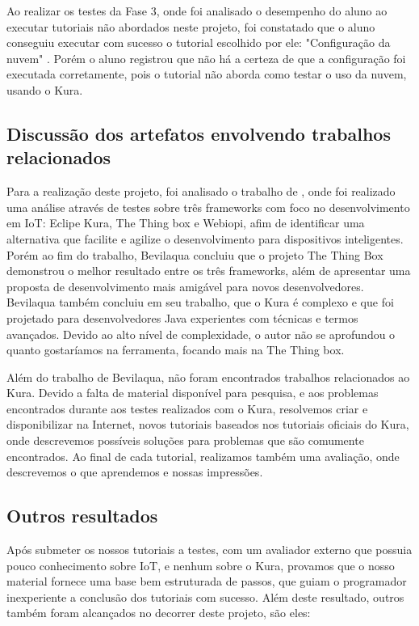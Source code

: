 Ao realizar os testes da Fase 3, onde foi analisado o desempenho do aluno ao executar tutoriais não abordados neste projeto, foi constatado que o aluno conseguiu executar com sucesso o tutorial escolhido por ele: "Configuração da nuvem" \cite{CloudConfiguration}. Porém o aluno registrou que não há a certeza de que a configuração foi executada corretamente, pois o tutorial não aborda como testar o uso da nuvem, usando o Kura.

\subsection{Discussão dos artefatos envolvendo trabalhos relacionados}

Para a realização deste projeto, foi analisado o trabalho de \cite{bevilaqua2016analise}, onde foi realizado uma análise através de testes sobre três frameworks com foco no desenvolvimento em IoT: Eclipe Kura, The Thing box e Webiopi, afim de identificar uma alternativa que facilite e agilize o desenvolvimento para dispositivos inteligentes. Porém ao fim do trabalho, Bevilaqua concluiu que o projeto The Thing Box demonstrou o melhor resultado entre os três frameworks, além de apresentar uma proposta de desenvolvimento mais amigável para novos desenvolvedores. Bevilaqua também concluiu em seu trabalho, que o Kura é complexo e que foi projetado para desenvolvedores Java experientes com técnicas e termos avançados. Devido ao alto nível de complexidade, o autor não se aprofundou o quanto gostaríamos na ferramenta, focando mais na The Thing box.

Além do trabalho de Bevilaqua, não foram encontrados trabalhos relacionados ao Kura. Devido a falta de material disponível para pesquisa, e aos problemas encontrados durante aos testes realizados com o Kura, resolvemos criar e disponibilizar na Internet, novos tutoriais baseados nos tutoriais oficiais do Kura, onde descrevemos possíveis soluções para problemas que são comumente encontrados. Ao final de cada tutorial, realizamos também uma avaliação, onde descrevemos o que aprendemos e nossas impressões.

\subsection{Outros resultados}

Após submeter os nossos tutoriais a testes, com um avaliador externo que possuia pouco conhecimento sobre IoT, e nenhum sobre o Kura, provamos que o nosso material fornece uma base bem estruturada de passos, que guiam o programador inexperiente a conclusão dos tutoriais com sucesso. Além deste resultado, outros também foram alcançados no decorrer deste projeto, são eles:

